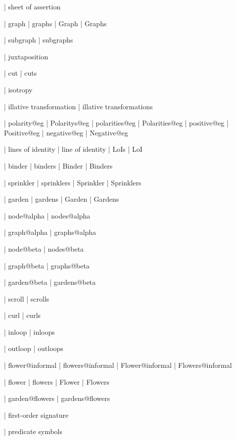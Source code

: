 
 | sheet of assertion
 
 | graph
 | graphs
 | Graph
 | Graphs

 | subgraph
 | subgraphs

 | juxtaposition

 | cut
 | cuts

 | isotropy

 | illative transformation
 | illative transformations

 | polarity@eg
 | Polaritys@eg
 | polarities@eg
 | Polarities@eg
 | positive@eg
 | Positive@eg
 | negative@eg
 | Negative@eg

 | lines of identity
 | line of identity
 | LoIs
 | LoI

 | binder
 | binders
 | Binder
 | Binders

 | sprinkler
 | sprinklers
 | Sprinkler
 | Sprinklers

 | garden
 | gardens
 | Garden
 | Gardens

 | node@alpha
 | nodes@alpha

 | graph@alpha
 | graphs@alpha

 | node@beta
 | nodes@beta

 | graph@beta
 | graphs@beta

 | garden@beta
 | gardens@beta


 | scroll
 | scrolls

 | curl
 | curls

 | inloop
 | inloops

 | outloop
 | outloops

 | flower@informal
 | flowers@informal
 | Flower@informal
 | Flowers@informal

 | flower
 | flowers
 | Flower
 | Flowers

 | garden@flowers
 | gardens@flowers

 | first-order signature

 | predicate symbols

